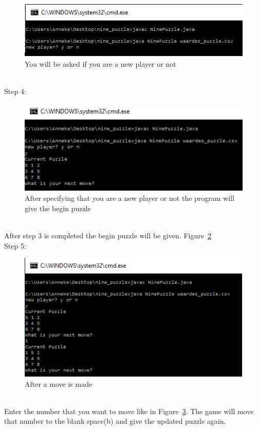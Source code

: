 \documentclass[10pt]{article}
\begin{document}
\begin{figure}
\centering
 \includegraphics[scale=0.8]{./Prente/prent1.png}
  \caption{You will be asked if you are a new player or not}
  \label{prent1}
\end{figure}
\\Step 4:
\begin{figure}
\centering
 \includegraphics[scale=0.8]{./Prente/prent2.png}
 \caption{After specifying that you are a new player or not the program will give the begin puzzle}
 \label{prent2}
\end{figure}
\\After step 3 is completed the begin puzzle will be given. Figure~\ref{prent2}
\\Step 5:
\begin{figure}
\centering
 \includegraphics[scale=0.8]{./Prente/prent3.png}
 \caption{After a move is made}
 \label{prent3}
\end{figure}
\\Enter the number that you want to move like in Figure~\ref{prent3}. The game will move that number to the blank space(b) and give the updated puzzle again.
\end{document}
